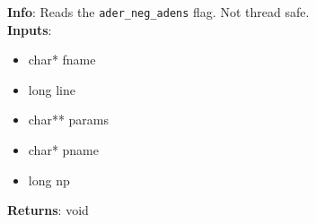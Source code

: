 \textbf{Info}: Reads the \verb|ader_neg_adens| flag. Not thread safe.\\

\noindent \textbf{Inputs}:
\begin{itemize}
\item{char* fname}
\item{long line}
\item{char** params}
\item{char* pname}
\item{long np}
\end{itemize}

\noindent \textbf{Returns}: void
